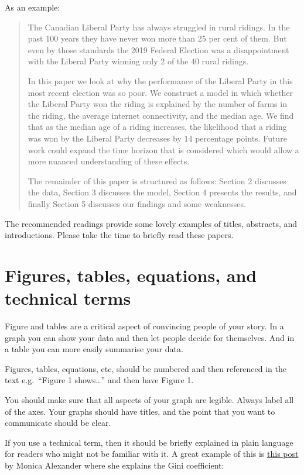 \documentclass[
]{book}
\begin{document}
As an example:

\begin{quote}
The Canadian Liberal Party has always struggled in rural ridings. In the past 100 years they have never won more than 25 per cent of them. But even by those standards the 2019 Federal Election was a disappointment with the Liberal Party winning only 2 of the 40 rural ridings.

In this paper we look at why the performance of the Liberal Party in this most recent election was so poor. We construct a model in which whether the Liberal Party won the riding is explained by the number of farms in the riding, the average internet connectivity, and the median age. We find that as the median age of a riding increases, the likelihood that a riding was won by the Liberal Party decreases by 14 percentage points. Future work could expand the time horizon that is considered which would allow a more nuanced understanding of these effects.

The remainder of this paper is structured as follows: Section 2 discusses the data, Section 3 discusses the model, Section 4 presents the results, and finally Section 5 discusses our findings and some weaknesses.
\end{quote}

The recommended readings provide some lovely examples of titles, abstracts, and introductions. Please take the time to briefly read these papers.

\hypertarget{figures-tables-equations-and-technical-terms}{%
\section{Figures, tables, equations, and technical terms}\label{figures-tables-equations-and-technical-terms}}

Figure and tables are a critical aspect of convincing people of your story. In a graph you can show your data and then let people decide for themselves. And in a table you can more easily summarise your data.

Figures, tables, equations, etc, should be numbered and then referenced in the text e.g.~``Figure 1 shows\ldots{}'' and then have Figure 1.

You should make sure that all aspects of your graph are legible. Always label all of the axes. Your graphs should have titles, and the point that you want to communicate should be clear.

If you use a technical term, then it should be briefly explained in plain language for readers who might not be familiar with it. A great example of this is \href{https://www.monicaalexander.com/posts/2019-20-01-babynames/}{this post} by Monica Alexander where she explains the Gini coefficient:
\end{document}
